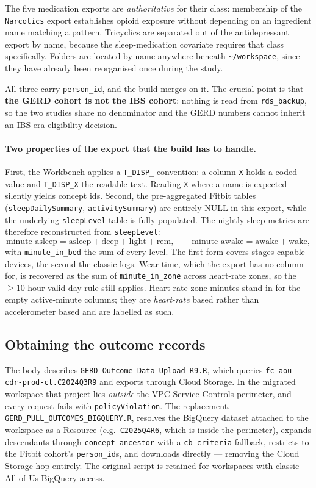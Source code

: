 \documentclass[11pt]{article}
\newcommand{\code}[1]{\texttt{\small #1}}
\begin{document}
\noindent The five medication exports are \emph{authoritative} for their class:
membership of the \code{Narcotics} export establishes opioid exposure without
depending on an ingredient name matching a pattern. Tricyclics are separated out
of the antidepressant export by name, because the sleep-medication covariate
requires that class specifically. Folders are located by name anywhere beneath
\code{\textasciitilde/workspace}, since they have already been reorganised once
during the study.

\noindent All three carry \code{person\_id}, and the build merges on it. The
crucial point is that \textbf{the GERD cohort is not the IBS cohort}: nothing is
read from \code{rds\_backup}, so the two studies share no denominator and the
GERD numbers cannot inherit an IBS-era eligibility decision.

\paragraph{Two properties of the export that the build has to handle.}
First, the Workbench applies a \code{T\_DISP\_} convention: a column \code{X}
holds a coded value and \code{T\_DISP\_X} the readable text. Reading \code{X}
where a name is expected silently yields concept ids. Second, the pre-aggregated
Fitbit tables (\code{sleepDailySummary}, \code{activitySummary}) are entirely
NULL in this export, while the underlying \code{sleepLevel} table is fully
populated. The nightly sleep metrics are therefore reconstructed from
\code{sleepLevel}:
\[
\text{minute\_asleep} = \text{asleep} + \text{deep} + \text{light} + \text{rem},
\qquad
\text{minute\_awake} = \text{awake} + \text{wake},
\]
with \code{minute\_in\_bed} the sum of every level. The first form covers
stages-capable devices, the second the classic logs. Wear time, which the export
has no column for, is recovered as the sum of \code{minute\_in\_zone} across
heart-rate zones, so the $\geq 10$-hour valid-day rule still applies. Heart-rate
zone minutes stand in for the empty active-minute columns; they are
\emph{heart-rate} based rather than accelerometer based and are labelled as such.

\subsection{Obtaining the outcome records}
The body describes \code{GERD Outcome Data Upload R9.R}, which queries
\code{fc-aou-cdr-prod-ct.C2024Q3R9} and exports through Cloud Storage. In the
migrated workspace that project lies \emph{outside} the VPC Service Controls
perimeter, and every request fails with
\code{policyViolation}. The replacement,
\code{GERD_PULL_OUTCOMES_BIGQUERY.R}, resolves the BigQuery dataset attached to
the workspace as a Resource (e.g.\ \code{C2025Q4R6}, which is inside the
perimeter), expands descendants through \code{concept_ancestor} with a
\code{cb_criteria} fallback, restricts to the Fitbit cohort's \code{person_id}s,
and downloads directly --- removing the Cloud Storage hop entirely. The original
script is retained for workspaces with classic All of Us BigQuery access.
\end{document}
